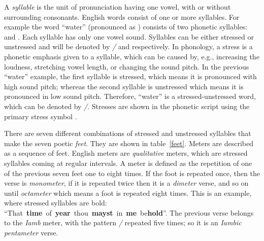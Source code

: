 \documentclass[journal,10pt,twocolumns,letter]{IEEEtran}
\begin{document}
A \textit{syllable} is the unit of pronunciation having one vowel, with or without surrounding
consonants. English words consist of one or more syllables. For example the word \mbox{``water''}
(pronounced as \mbox{}) consists of two phonetic syllables:
\mbox{} and \mbox{}. Each syllable has only one
vowel sound. Syllables can be either stressed or unstressed and will be denoted by \textit{/} and
 respectively. In phonology, a stress is a phonetic emphasis given to a syllable, which can
be caused by, e.g., increasing the loudness, stretching vowel length, or changing the sound
pitch. In the previous ``water'' example, the first syllable is stressed, which means it is
pronounced with high sound pitch; whereas the second syllable is unstressed which means it is
pronounced in low sound pitch. Therefore, ``water'' is a stressed-unstressed word, which can be
denoted by \mbox{\textit{/}}. Stresses are shown in the phonetic script using the primary stress
symbol .
\begin{table}[!tb]
  \centering
  \caption{The seven feet of English poem. Every foot is a combination of stressed and unstressed
    syllables, denoted by \textit{/} and \textit{x} respectively.}\label{feet}
\end{table}
There are seven different combinations of stressed and unstressed syllables that make the seven
poetic \textit{feet}.  They are shown in table~\ref{feet}. Meters are described as a sequence of
feet. English meters are \textit{qualitative} meters, which are stressed syllables coming at regular
intervals. A meter is defined as the repetition of one of the previous seven feet one to eight
times. If the foot is repeated once, then the verse is \textit{monometer}, if it is repeated twice
then it is a \textit{dimeter} verse, and so on until \textit{octameter} which means a foot is
repeated eight times. This is an example, where stressed syllables are bold: \mbox{``That
  \textbf{time} of \textbf{year} thou \textbf{mayst} in \textbf{me} be\textbf{hold}''}. The previous
verse belongs to the \textit{Iamb} meter, with the pattern \mbox{\textit{/}} repeated five times;
so it is an \textit{Iambic pentameter} verse.
\end{document}
